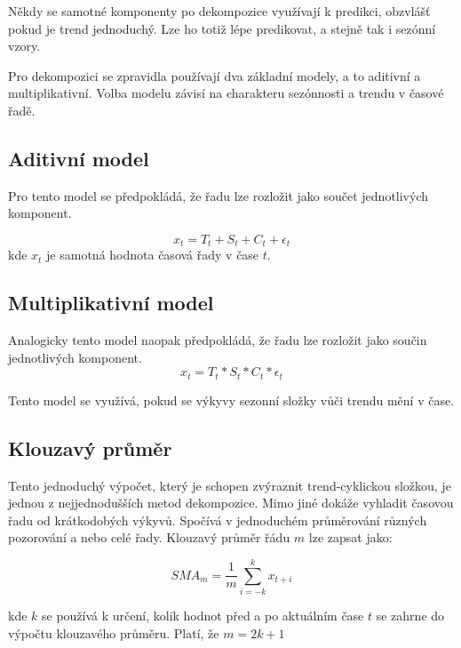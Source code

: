\documentclass[FM,BP,fonts]{tulthesis}
\begin{document}
Někdy se samotné komponenty po dekompozice využívají k predikci, obzvlášť pokud je trend jednoduchý. Lze ho totiž lépe predikovat, a stejně tak i sezónní vzory. \cite{Hyndman2013-wm}

Pro dekompozici se zpravidla používají dva základní modely, a to aditivní a multiplikativní. Volba modelu závisí na charakteru sezónnosti a trendu v časové řadě.

\subsection{Aditivní model}
Pro tento model se předpokládá, že řadu lze rozložit jako součet jednotlivých komponent.

\begin{equation}
	x_t = T_t + S_t + C_t + \epsilon_t
\end{equation}
kde $x_t$ je samotná hodnota časová řady v čase $t$.


\subsection{Multiplikativní model}
Analogicky tento model naopak předpokládá, že řadu lze rozložit jako součin jednotlivých komponent.
\begin{equation}
	x_t = T_t * S_t * C_t * \epsilon_t
\end{equation}

Tento model se využívá, pokud se výkyvy sezonní složky vůči trendu mění v čase.

 
\subsection{Klouzavý průměr}
Tento jednoduchý výpočet, který je schopen zvýraznit trend-cyklickou složkou, je jednou z nejjednodušších metod dekompozice. Mimo jiné dokáže vyhladit časovou řadu od krátkodobých výkyvů. Spočívá v jednoduchém průměrování různých pozorování a nebo celé řady.  Klouzavý průměr řádu $m$ lze zapsat jako:
 
\begin{equation}
SMA_m = \frac{1}{m} \sum_{i=-k}^{k}x_{t+i}
\end{equation}
 
kde $k$ se používá k určení, kolik hodnot před a po aktuálním čase $t$ se zahrne do výpočtu klouzavého průměru. Platí, že $m = 2k+1$
\end{document}
